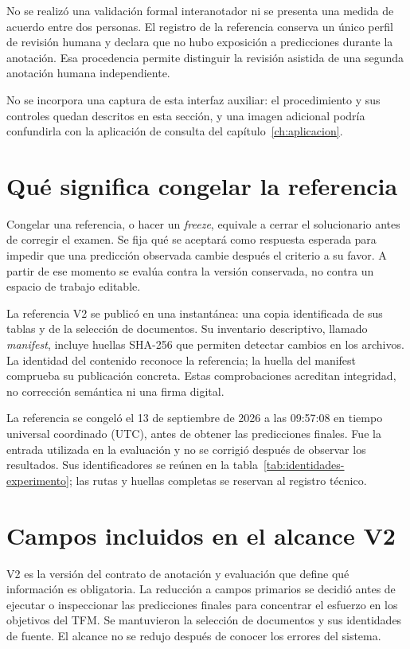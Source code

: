No se realizó una validación formal interanotador ni se presenta una medida
de acuerdo entre dos personas. El registro de la referencia
conserva un único perfil de revisión humana y declara que no hubo exposición
a predicciones durante la anotación. Esa procedencia permite distinguir la
revisión asistida de una segunda anotación humana independiente.

No se incorpora una captura de esta interfaz auxiliar: el procedimiento y sus
controles quedan descritos en esta sección, y una imagen adicional podría
confundirla con la aplicación de consulta del
capítulo~\ref{ch:aplicacion}.

\section{Qué significa congelar la referencia}
Congelar una referencia, o hacer un \emph{freeze}, equivale a cerrar el
solucionario antes de corregir el examen. Se fija qué se aceptará como
respuesta esperada para impedir que una predicción observada cambie después
el criterio a su favor. A partir de ese momento se evalúa contra la versión
conservada, no contra un espacio de trabajo editable.

La referencia V2 se publicó en una instantánea: una copia identificada de
sus tablas y de la selección de documentos. Su inventario descriptivo, llamado
\emph{manifest}, incluye huellas SHA-256 que permiten detectar cambios en
los archivos. La identidad del contenido reconoce la referencia; la huella
del manifest comprueba su publicación concreta. Estas comprobaciones
acreditan integridad, no corrección semántica ni una firma digital.

La referencia se congeló el 13 de septiembre de 2026 a las 09:57:08 en tiempo
universal coordinado (UTC),
antes de obtener las predicciones finales. Fue la entrada utilizada en la
evaluación y no se corrigió después de observar los resultados. Sus
identificadores se reúnen en la tabla~\ref{tab:identidades-experimento};
las rutas y huellas completas se reservan al registro técnico.

\section{Campos incluidos en el alcance V2}
\label{sec:alcance-v2}
V2 es la versión del contrato de anotación y evaluación que define qué
información es obligatoria. La reducción a campos primarios se decidió
antes de ejecutar o inspeccionar las predicciones finales para concentrar
el esfuerzo en los objetivos del TFM. Se mantuvieron la selección de
documentos y sus identidades de fuente. El alcance no se redujo después
de conocer los errores del sistema.

